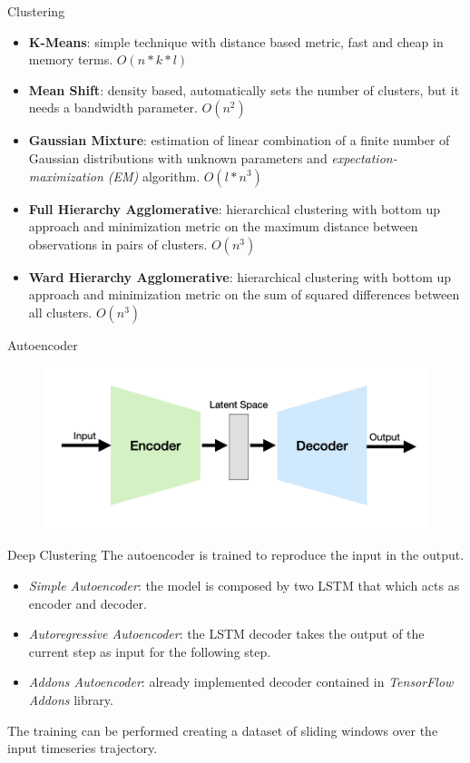 \documentclass{beamer}
\begin{document}
\begin{frame}{Clustering}
\begin{itemize}
	\item \textbf{K-Means}: simple technique with distance based metric, fast and cheap in memory terms. $O(n*k*l)$
	\item \textbf{Mean Shift}: density based, automatically sets the number of clusters, but it needs a bandwidth parameter. $O(n ^ 2)$
	\item \textbf{Gaussian Mixture}: estimation of linear combination of a finite number of Gaussian distributions with unknown parameters and \textit{expectation-maximization (EM)} algorithm. $O(l * n ^ 3)$
	\item \textbf{Full Hierarchy Agglomerative}: hierarchical clustering with bottom up approach and minimization metric on the maximum distance between observations in pairs of clusters. $O(n ^ 3)$
	\item \textbf{Ward Hierarchy Agglomerative}: hierarchical clustering with bottom up approach and minimization metric on the sum of squared differences between all clusters. $O(n ^ 3)$
\end{itemize}
\end{frame}

\begin{frame}{Autoencoder}
	\begin{figure}[bt]
		\centering
		\includegraphics[width=\textwidth]{autoencoder-schema}
		\label{fig:autoencoder-schema}
	\end{figure}
\end{frame}

\begin{frame}{Deep Clustering}
	The autoencoder is trained to reproduce the input in the output. 
	\begin{itemize}
		\item \textit{Simple Autoencoder}: the model is composed by two LSTM that which acts as encoder and decoder.
		\item \textit{Autoregressive Autoencoder}: the LSTM decoder takes the output of the current step as input for the following step.
		\item \textit{Addons Autoencoder}: already implemented decoder contained in \textit{TensorFlow Addons} library. 
	\end{itemize}
	The training can be performed creating a dataset of sliding windows over the input timeseries trajectory.
\end{frame}
\end{document}
